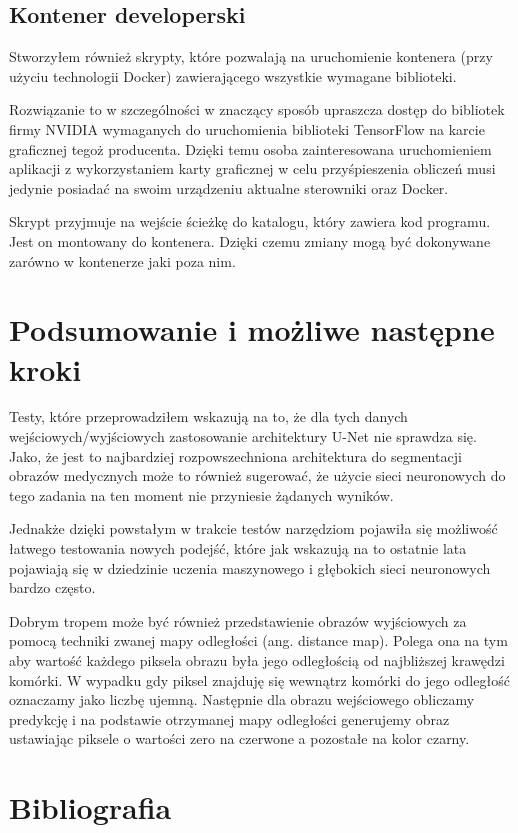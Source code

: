 \documentclass{article}
\begin{document}
\subsection{Kontener developerski}
Stworzyłem również skrypty, które pozwalają na uruchomienie kontenera (przy użyciu technologii Docker) zawierającego wszystkie wymagane biblioteki.

Rozwiązanie to w szczególności w znaczący sposób upraszcza dostęp do bibliotek firmy NVIDIA wymaganych do uruchomienia biblioteki TensorFlow na karcie graficznej tegoż producenta.
Dzięki temu osoba zainteresowana uruchomieniem aplikacji z wykorzystaniem karty graficznej w celu przyśpieszenia obliczeń musi jedynie posiadać na swoim urządzeniu aktualne sterowniki oraz Docker.

Skrypt przyjmuje na wejście ścieżkę do katalogu, który zawiera kod programu.
Jest on montowany do kontenera.
Dzięki czemu zmiany mogą być dokonywane zarówno w kontenerze jaki poza nim.
\newpage
\section{Podsumowanie i możliwe następne kroki}
Testy, które przeprowadziłem wskazują na to, że dla tych danych wejściowych/wyjściowych zastosowanie architektury U-Net nie sprawdza się.
Jako, że jest to najbardziej rozpowszechniona architektura do segmentacji obrazów medycznych może to również sugerować, że użycie sieci neuronowych do tego zadania na ten moment nie przyniesie żądanych wyników.

Jednakże dzięki powstałym w trakcie testów narzędziom pojawiła się możliwość łatwego testowania nowych podejść, które jak wskazują na to ostatnie lata pojawiają się w dziedzinie uczenia maszynowego i głębokich sieci neuronowych bardzo często.

Dobrym tropem może być również przedstawienie obrazów wyjściowych za pomocą techniki zwanej mapy odległości (ang. distance map).
Polega ona na tym aby wartość każdego piksela obrazu była
jego odległością od najbliższej krawędzi komórki.
W wypadku gdy piksel znajduję się wewnątrz komórki do jego odległość oznaczamy jako liczbę ujemną. Następnie dla obrazu wejściowego obliczamy predykcję i na podstawie otrzymanej mapy odległości generujemy obraz ustawiając piksele o wartości zero na czerwone a pozostałe na kolor czarny.
\newpage
\section{Bibliografia}
{}

\end{document}
